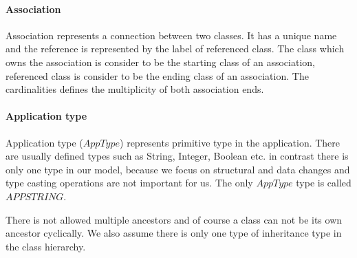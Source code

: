 \documentclass[runningheads]{comsis}
\begin{document}
\paragraph {Association} Association represents a connection between two classes. It has a unique name and the reference is represented by the label of referenced class. The class which owns the association is consider to be the starting class of an association, referenced class is consider to be the ending class of an association. The cardinalities defines the multiplicity of both association ends.


\paragraph{Application type} Application type ($AppType$) represents primitive type in the application. There are usually defined types such as String, Integer, Boolean etc. in contrast there is only one type in our model, because we focus on structural and data changes and type casting operations are not important for us. The only $AppType$ type is called $APPSTRING$.

 There is not allowed multiple ancestors and of course a class can not be its own ancestor cyclically. We also assume there is only one type of inheritance type in the class hierarchy.
\end{document}
